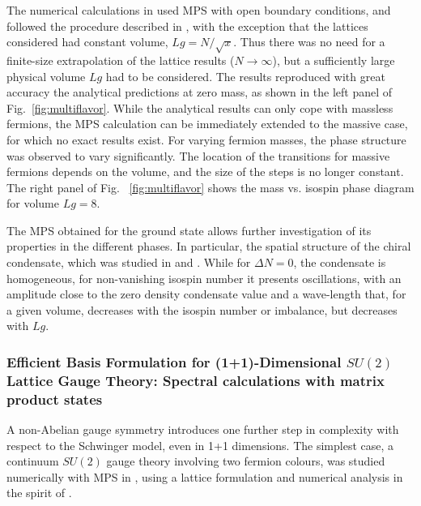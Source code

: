 \documentclass[epj,final]{svjour}
\begin{document}
The numerical calculations in \cite{banuls2017density} used MPS with open boundary conditions, and followed the procedure described in \cite{Banuls2013}, with the exception that the lattices considered had constant volume, $Lg=N/\sqrt{x}$. Thus there was no need for a finite-size extrapolation of the lattice results ($N\to\infty$), but a sufficiently large physical volume $Lg$ had to be considered. The results reproduced with great accuracy the analytical predictions at zero mass, as shown in the left panel of Fig.~\ref{fig:multiflavor}. While the analytical results can only cope with massless fermions, the MPS calculation can be immediately extended to the massive case, for which no exact results exist. For varying fermion masses, the phase structure was observed to vary significantly. The location of the transitions for massive fermions depends on the volume, and the size of the steps is no longer constant. The right panel of Fig. ~\ref{fig:multiflavor} shows the mass vs. isospin phase diagram for volume $Lg=8$.

The MPS obtained for the ground state allows further investigation of its properties in the different phases. In particular, the spatial structure of the chiral condensate, which was studied in \cite{banuls2017density} and \cite{banuls2016multif}. While for $\Delta N=0$, the condensate is homogeneous, for non-vanishing isospin number it presents oscillations, with an amplitude close to the zero density condensate value and a wave-length that, for a given volume, decreases with the isospin number or imbalance, but decreases with $Lg$.

\subsubsection{Efficient Basis Formulation for (1+1)-Dimensional $SU(2)$ Lattice Gauge Theory: Spectral calculations with matrix product states\cite{banuls2017efficient}}

A non-Abelian gauge symmetry introduces one further step in complexity with respect to the Schwinger model, even in 1+1 dimensions. The simplest case, a continuum $SU(2)$ gauge theory involving two fermion colours, was studied numerically with MPS in \cite{banuls2017efficient}, using a lattice formulation and numerical analysis in the spirit of \cite{Banuls2013}.
\end{document}
